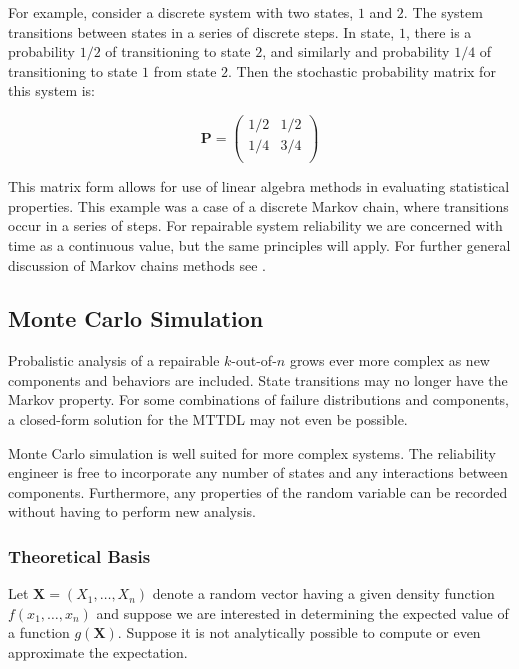 \documentclass[11pt]{article}
\numberwithin{equation}{section}
\begin{document}
For example, consider a discrete system with two states, $1$ and $2$.  The
system transitions between states in a series of discrete steps.  In state,
$1$, there is a probability $1/2$ of transitioning to state $2$, and similarly
and probability $1/4$ of transitioning to state $1$ from state $2$.  Then the
stochastic probability matrix for this system is:

\begin{displaymath}
\mathbf{P} =
\left( \begin{array}{cc}
1/2 & 1/2 \\
1/4 & 3/4 \\
\end{array} \right)
\end{displaymath}

This matrix form allows for use of linear algebra methods in evaluating
statistical properties.  This example was a case of a discrete Markov chain,
where transitions occur in a series of steps.  For repairable system
reliability we are concerned with time as a continuous value, but the same
principles will apply.  For further general discussion of Markov chains
methods see \cite{chains}.

\subsection{Monte Carlo Simulation}

Probalistic analysis of a repairable $k$-out-of-$n$ grows ever more complex as
new components and behaviors are included.  State transitions may no longer
have the Markov property.  For some combinations of failure distributions and
components, a closed-form solution for the MTTDL may not even be possible.

Monte Carlo simulation is well suited for more complex systems.  The
reliability engineer is free to incorporate any number of states and any
interactions between components.  Furthermore, any properties of the random
variable can be recorded without having to perform new analysis.

\subsubsection{Theoretical Basis}

Let $\mathbf{X} = (X_{1}, \ldots, X_{n})$ denote a random vector having a
given density function $f(x_{1}, \ldots, x_{n})$ and suppose we are interested
in determining the expected value of a function $g(\mathbf{X})$.  Suppose it
is not analytically possible to compute or even approximate the expectation.
\end{document}
